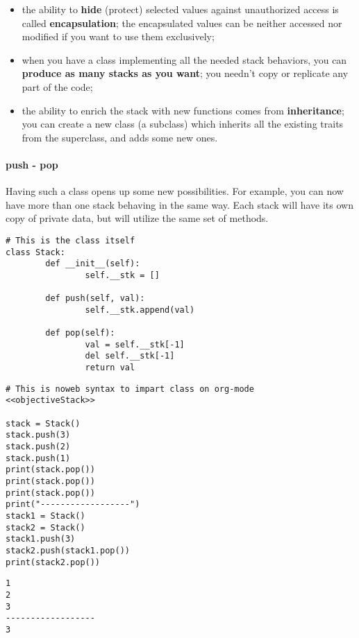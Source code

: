 \documentclass[11pt]{article}
\begin{document}
\begin{itemize}
\item the ability to \textbf{hide} (protect) selected values against unauthorized
access is called \textbf{encapsulation}; the encapsulated values can be
neither accessed nor modified if you want to use them exclusively;
\item when you have a class implementing all the needed stack behaviors,
you can \textbf{produce as many stacks as you want}; you needn’t copy or
replicate any part of the code;
\item the ability to enrich the stack with new functions comes from
\textbf{inheritance}; you can create a new class (a subclass) which
inherits all the existing traits from the superclass, and adds some
new ones.
\end{itemize}

\paragraph{push - pop}
\label{sec:orgeed7399}
Having such a class opens up some new possibilities. For example, you
can now have more than one stack behaving in the same way. Each stack
will have its own copy of private data, but will utilize the same set
of methods.

\begin{verbatim}
# This is the class itself 
class Stack:
        def __init__(self):
                self.__stk = []

        def push(self, val):
                self.__stk.append(val)

        def pop(self):
                val = self.__stk[-1]
                del self.__stk[-1]
                return val

\end{verbatim}


\begin{verbatim}
# This is noweb syntax to impart class on org-mode
<<objectiveStack>>

stack = Stack()
stack.push(3)
stack.push(2)
stack.push(1)
print(stack.pop())
print(stack.pop())
print(stack.pop())
print("------------------")
stack1 = Stack()
stack2 = Stack()
stack1.push(3)
stack2.push(stack1.pop())
print(stack2.pop())
\end{verbatim}

\begin{verbatim}
1
2
3
------------------
3
\end{verbatim}
\end{document}
